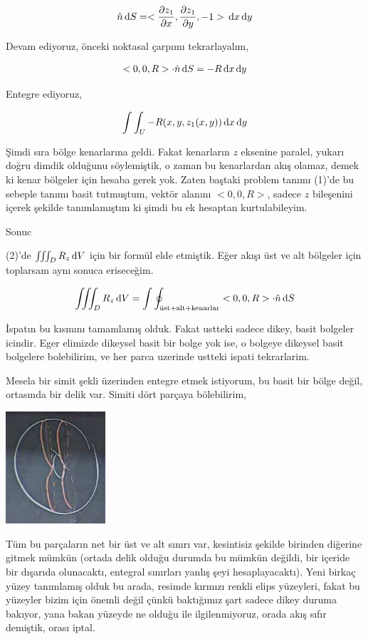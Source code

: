 \documentclass[12pt,fleqn]{article}\usepackage{../../common}
\begin{document}
$$
\hat{n} \,\mathrm{d} S =
<\frac{\partial z_1}{\partial x},
\frac{\partial z_1}{\partial y},
-1 >
\,\mathrm{d} x \,\mathrm{d} y
$$

Devam ediyoruz, önceki noktasal çarpımı tekrarlayalım,

$$
< 0,0,R > \cdot \hat{n} \,\mathrm{d} S = -R \,\mathrm{d} x \,\mathrm{d} y
$$

Entegre ediyoruz,

$$
\int \int_U -R (x,y,z_1(x,y)) \,\mathrm{d} x \,\mathrm{d} y
$$

Şimdi sıra bölge kenarlarına geldi. Fakat kenarların $z$ eksenine paralel,
yukarı doğru dimdik olduğunu söylemiştik, o zaman bu kenarlardan akış olamaz,
demek ki kenar bölgeler için hesaba gerek yok. Zaten baştaki problem tanımı
(1)'de bu sebeple tanımı basit tutmuştum, vektör alanını $< 0,0,R > $,
sadece $z$ bileşenini içerek şekilde tanımlamıştım ki şimdi bu ek hesaptan
kurtulabileyim.

Sonuc

(2)'de $\iiint_D R_z \,\mathrm{d} V$ için bir formül elde etmiştik. Eğer akışı üst
ve alt bölgeler için toplarsam aynı sonuca eriseceğim.

$$
\iiint_D R_z \,\mathrm{d} V = \int \oint_{\textrm{üst+alt+kenarlar}} < 0,0,R >
\cdot \hat{n} \,\mathrm{d} S
$$

İspatın bu kısmını tamamlamış olduk. Fakat ustteki sadece dikey, basit bolgeler
icindir. Eger elimizde dikeysel basit bir bolge yok ise, o bolgeye dikeysel
basit bolgelere bolebilirim, ve her parca uzerinde ustteki ispati tekrarlarim.

Mesela bir simit şekli üzerinden entegre etmek istiyorum, bu basit bir bölge
değil, ortasında bir delik var. Simiti dört parçaya bölebilirim,

\includegraphics[width=10em]{calc_multi_29_03.jpg}

Tüm bu parçaların net bir üst ve alt sınırı var, kesintisiz şekilde birinden
diğerine gitmek mümkün (ortada delik olduğu durumda bu mümkün değildi, bir
içeride bir dışarıda olunacaktı, entegral sınırları yanlış şeyi hesaplayacaktı).
Yeni birkaç yüzey tanımlamış olduk bu arada, resimde kırmızı renkli elips
yüzeyleri, fakat bu yüzeyler bizim için önemli değil çünkü baktığımız şart
sadece dikey duruma bakıyor, yana bakan yüzeyde ne olduğu ile ilgilenmiyoruz,
orada akış sıfır demiştik, orası iptal.
\end{document}
